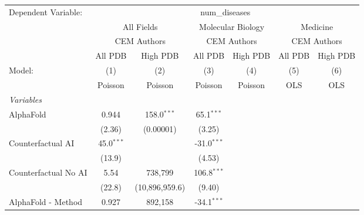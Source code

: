 \begingroup
\centering
\begin{tabular}{lcccccc}
   \tabularnewline \midrule \midrule
   Dependent Variable: & \multicolumn{6}{c}{num\_diseases}\\
 & \multicolumn{2}{c}{All Fields} & \multicolumn{2}{c}{Molecular Biology} & \multicolumn{2}{c}{Medicine} \\
\cmidrule(lr){2-3} \cmidrule(lr){4-5} \cmidrule(lr){6-7}
 & \multicolumn{2}{c}{CEM Authors} & \multicolumn{2}{c}{CEM Authors} & \multicolumn{2}{c}{CEM Authors} \\
\cmidrule(lr){2-3} \cmidrule(lr){4-5} \cmidrule(lr){6-7}
 & \multicolumn{1}{c}{All PDB} & \multicolumn{1}{c}{High PDB} & \multicolumn{1}{c}{All PDB} & \multicolumn{1}{c}{High PDB} & \multicolumn{1}{c}{All PDB} & \multicolumn{1}{c}{High PDB} \\
\cmidrule(lr){2-2} \cmidrule(lr){3-3} \cmidrule(lr){4-4} \cmidrule(lr){5-5} \cmidrule(lr){6-6} \cmidrule(lr){7-7}
   Model:                                                     & (1)          & (2)                   & (3)           & (4)     & (5)  & (6)\\  
                                                              &  Poisson     & Poisson               & Poisson       & Poisson & OLS  & OLS\\  
   \midrule
   \emph{Variables}\\
   AlphaFold                                                  & 0.944        & 158.0$^{***}$         & 65.1$^{***}$  &         &      &   \\   
                                                              & (2.36)       & (0.00001)             & (3.25)        &         &      &   \\   
   Counterfactual AI                                          & 45.0$^{***}$ &                       & -31.0$^{***}$ &         &      &   \\   
                                                              & (13.9)       &                       & (4.53)        &         &      &   \\   
   Counterfactual No AI                                       & 5.54         & 738,799               & 106.8$^{***}$ &         &      &   \\   
                                                              & (22.8)       & (10,896,959.6)        & (9.40)        &         &      &   \\   
   AlphaFold - Method                                         & 0.927        & 892,158               & -34.1$^{***}$ &         &      &   \\   

\end{tabular}
